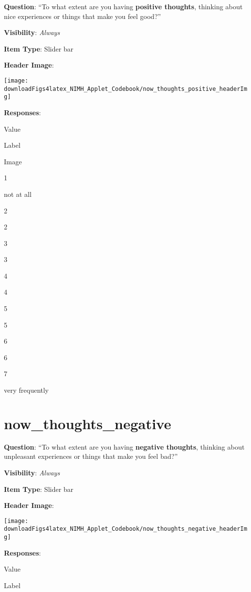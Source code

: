 \documentclass[]{book}
\begin{document}
\textbf{Question}: ``To what extent are you having \textbf{positive thoughts}, thinking about nice experiences or things that make you feel good?''

\textbf{Visibility}: \emph{Always}

\textbf{Item Type}: Slider bar

\textbf{Header Image}:

\begin{flushleft}\texttt{[image: downloadFigs4latex\_NIMH\_Applet\_Codebook/now\_thoughts\_positive\_headerImg]} \end{flushleft}

\textbf{Responses}:

Value

Label

Image

1

not at all

2

2

3

3

4

4

5

5

6

6

7

very frequently

\hypertarget{now_thoughts_negative}{%
\section{now\_thoughts\_negative}\label{now_thoughts_negative}}

\textbf{Question}: ``To what extent are you having \textbf{negative thoughts}, thinking about unpleasant experiences or things that make you feel bad?''

\textbf{Visibility}: \emph{Always}

\textbf{Item Type}: Slider bar

\textbf{Header Image}:

\begin{flushleft}\texttt{[image: downloadFigs4latex\_NIMH\_Applet\_Codebook/now\_thoughts\_negative\_headerImg]} \end{flushleft}

\textbf{Responses}:

Value

Label
\end{document}
